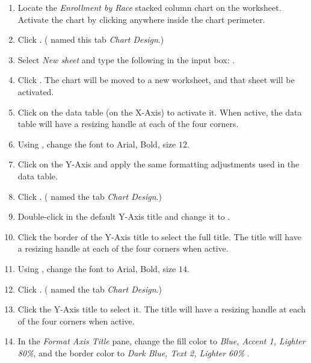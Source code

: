 \begin{enumbox}
	\begin{enumerate}
		\item Locate the \textit{Enrollment by Race} stacked column chart on the  worksheet. Activate the chart by clicking anywhere inside the chart perimeter.
		\item Click . ( named this tab \textit{Chart Design}.) 
		\item Select \textit{New sheet} and type the following in the input box: . 
		\item Click . The chart will be moved to a new worksheet, and that sheet will be activated.
		\item Click on the data table (on the X-Axis) to activate it. When active, the data table will have a resizing handle at each of the four corners.
		\item Using , change the font to Arial, Bold, size $ 12 $.
		\item Click on the Y-Axis and apply the same formatting adjustments used in the data table. 
		\item Click . ( named the tab \textit{Chart Design}.)
		\item Double-click in the default Y-Axis title and change it to .
		\item Click the border of the Y-Axis title to select the full title. The title will have a resizing handle at each of the four corners when active.
		\item Using , change the font to Arial, Bold, size $ 14 $.
		\item Click . ( named the tab \textit{Chart Design}.)
		\item Click the Y-Axis title to select it. The title will have a resizing handle at each of the four corners when active.
		\item In the \textit{Format Axis Title} pane, change the fill color to \textit{Blue, Accent 1, Lighter 80\%}, and the border color to \textit{Dark Blue, Text 2, Lighter 60\%} .

\end{enumerate}
\end{enumbox}
